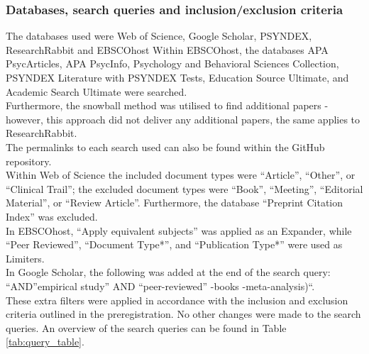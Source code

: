\documentclass[
  stu]{apa7}
\begin{document}
\subsubsection{Databases, search queries and inclusion/exclusion criteria}\label{databases-search-queries-and-inclusionexclusion-criteria}

The databases used were Web of Science, Google Scholar, PSYNDEX, ResearchRabbit and EBSCOhost Within EBSCOhost, the databases APA PsycArticles, APA PsycInfo, Psychology and Behavioral Sciences Collection, PSYNDEX Literature with PSYNDEX Tests, Education Source Ultimate, and Academic Search Ultimate were searched.\\
Furthermore, the snowball method was utilised to find additional papers - however, this approach did not deliver any additional papers, the same applies to ResearchRabbit.\\
The permalinks to each search used can also be found within the GitHub repository.\\
Within Web of Science the included document types were ``Article'', ``Other'', or ``Clinical Trail''; the excluded document types were ``Book'', ``Meeting'', ``Editorial Material'', or ``Review Article''.
Furthermore, the database ``Preprint Citation Index'' was excluded.\\
In EBSCOhost, ``Apply equivalent subjects'' was applied as an Expander, while ``Peer Reviewed'', ``Document Type*'', and ``Publication Type*'' were used as Limiters.\\
In Google Scholar, the following was added at the end of the search query: ``AND''empirical study'' AND ``peer-reviewed'' -books -meta-analysis)``.\\
These extra filters were applied in accordance with the inclusion and exclusion criteria outlined in the preregistration. No other changes were made to the search queries. An overview of the search queries can be found in Table \ref{tab:query_table}.
\end{document}
